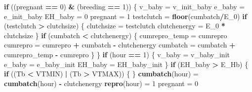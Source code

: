 \documentclass[]{article}
\newenvironment{Shaded}{\begin{snugshade}}{\end{snugshade}}
\newcommand{\KeywordTok}[1]{\textcolor[rgb]{0.13,0.29,0.53}{\textbf{#1}}}
\newcommand{\DecValTok}[1]{\textcolor[rgb]{0.00,0.00,0.81}{#1}}
\newcommand{\StringTok}[1]{\textcolor[rgb]{0.31,0.60,0.02}{#1}}
\newcommand{\ControlFlowTok}[1]{\textcolor[rgb]{0.13,0.29,0.53}{\textbf{#1}}}
\newcommand{\OperatorTok}[1]{\textcolor[rgb]{0.81,0.36,0.00}{\textbf{#1}}}
\newcommand{\NormalTok}[1]{#1}
\begin{document}
\begin{Shaded}
\begin{Highlighting}[]
{{{            \ControlFlowTok{if}\NormalTok{ ((pregnant }\OperatorTok{==}\StringTok{ }\DecValTok{0}\NormalTok{) }\OperatorTok{&}\StringTok{ }\NormalTok{(breeding }\OperatorTok{==}\StringTok{ }\DecValTok{1}\NormalTok{)) \{}
\NormalTok{                v_baby =}\StringTok{ }\NormalTok{v_init_baby}
\NormalTok{                e_baby =}\StringTok{ }\NormalTok{e_init_baby}
\NormalTok{                EH_baby =}\StringTok{ }\DecValTok{0}
\NormalTok{                pregnant =}\StringTok{ }\DecValTok{1}
\NormalTok{                testclutch =}\StringTok{ }\KeywordTok{floor}\NormalTok{(cumbatch}\OperatorTok{/}\NormalTok{E_}\DecValTok{0}\NormalTok{)}
                \ControlFlowTok{if}\NormalTok{ (testclutch }\OperatorTok{>}\StringTok{ }\NormalTok{clutchsize) \{}
\NormalTok{                  clutchsize =}\StringTok{ }\NormalTok{testclutch}
\NormalTok{                  clutchenergy =}\StringTok{ }\NormalTok{E_}\DecValTok{0} \OperatorTok{*}\StringTok{ }\NormalTok{clutchsize}
\NormalTok{                \}}
                \ControlFlowTok{if}\NormalTok{ (cumbatch }\OperatorTok{<}\StringTok{ }\NormalTok{clutchenergy) \{}
\NormalTok{                  cumrepro_temp =}\StringTok{ }\NormalTok{cumrepro}
\NormalTok{                  cumrepro =}\StringTok{ }\NormalTok{cumrepro }\OperatorTok{+}\StringTok{ }\NormalTok{cumbatch }\OperatorTok{-}\StringTok{ }\NormalTok{clutchenergy}
\NormalTok{                  cumbatch =}\StringTok{ }\NormalTok{cumbatch }\OperatorTok{+}\StringTok{ }\NormalTok{cumrepro_temp }\OperatorTok{-}\StringTok{ }\NormalTok{cumrepro}
\NormalTok{                \}}
\NormalTok{            \}}
            \ControlFlowTok{if}\NormalTok{ (hour }\OperatorTok{==}\StringTok{ }\DecValTok{1}\NormalTok{) \{}
\NormalTok{                v_baby =}\StringTok{ }\NormalTok{v_baby_init}
\NormalTok{                e_baby =}\StringTok{ }\NormalTok{e_baby_init}
\NormalTok{                EH_baby =}\StringTok{ }\NormalTok{EH_baby_init}
\NormalTok{            \}}
            \ControlFlowTok{if}\NormalTok{ (EH_baby }\OperatorTok{>}\StringTok{ }\NormalTok{E_Hb) \{}
                \ControlFlowTok{if}\NormalTok{ ((Tb }\OperatorTok{<}\StringTok{ }\NormalTok{VTMIN) }\OperatorTok{|}\StringTok{ }\NormalTok{(Tb }\OperatorTok{>}\StringTok{ }\NormalTok{VTMAX)) \{}
\NormalTok{                \}}
                \KeywordTok{cumbatch}\NormalTok{(hour) =}\StringTok{ }\KeywordTok{cumbatch}\NormalTok{(hour) }\OperatorTok{-}\StringTok{ }\NormalTok{clutchenergy}
                \KeywordTok{repro}\NormalTok{(hour) =}\StringTok{ }\DecValTok{1}
\NormalTok{                pregnant =}\StringTok{ }\DecValTok{0}
}}}
\end{Highlighting}
\end{Shaded}
\end{document}
